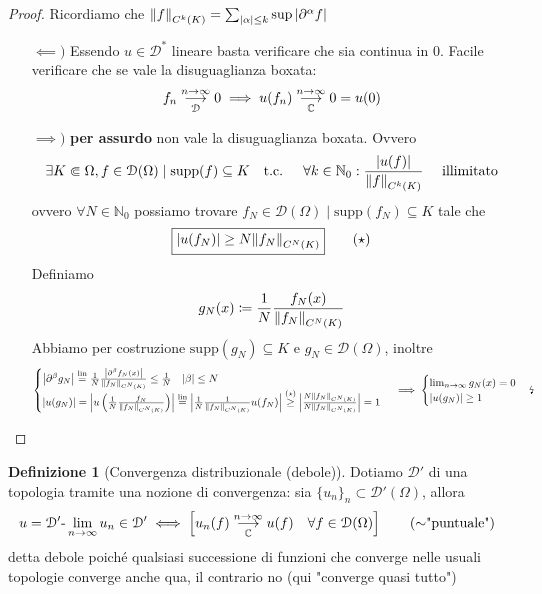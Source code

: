 \documentclass[a4paper,10pt]{article}
\theoremstyle{definition}
\newcommand{\na}{\mathbb{N}} %
\newcommand{\im}{\mathbb{C}} %
\newcommand{\supp}{\text{supp}} %
\newcommand{\llim}[2]{#2\text{-}\lim_{#1\to\infty}} %
\newcommand{\limm}[2]{\overunderset{#1\to\infty}{#2}{\longrightarrow}} %
\theoremstyle{indentdefinition}
\newtheorem{defn}{Definizione}[section]
\theoremstyle{indenttheorem}
\theoremstyle{myremark}
\theoremstyle{indentgeneral}
\begin{document}
    \begin{proof}
            Ricordiamo che $\norm{f}_{C^k(K)}=\sum_{\abs{\alpha}\le k}\sup\abs{\partial^\alpha f}$
            \begin{itemize}
                \item[$\impliedby)$] Essendo $u\in\mathcal{D}^*$ lineare basta verificare che sia continua in 0. Facile verificare che se vale la disuguaglianza boxata:
                $$f_n\limm{n}{\mathcal{D}}0\implies u(f_n)\limm{n}{\im}0=u(0)$$
                \item[$\implies)$] \textbf{per assurdo} non vale la disuguaglianza boxata. Ovvero
                $$\exists K\Subset \Omega,f\in\mathcal{D}(\Omega)\mid\supp(f)\subseteq K\quad \text{t.c. }\quad\forall k\in\na_0:\frac{\abs{u(f)}}{\norm{f}_{C^k(K)}}\quad \text{ illimitato} $$
ovvero $\forall N\in \na_0$ possiamo trovare $f_N\in\mathcal{D}(\Omega)\mid \supp(f_N)\subseteq K$ tale che
$$\boxed{\abs{u(f_N)}\ge N\norm{f_N}_{C^N(K)}}\qquad (\star)$$
Definiamo
$$g_N(x)\coloneqq\frac{1}{N} \frac{f_N(x)}{\norm{f_N}_{C^N(K)}}$$
Abbiamo per costruzione $\supp(g_N)\subseteq K$ e $g_N\in \mathcal{D}(\Omega)$, inoltre 
$$\begin{cases}
    \abs{\partial^\beta g_N}\overset{\text{lin}}{=}\frac{1}{N} \frac{\abs{\partial^\beta f_N(x)}}{\norm{f_N}_{C^N(K)}}\le \frac{1}{N} \quad \abs{\beta}\le N\\
    \abs{u(g_N)}=\abs{u\left(\frac{1}{N} \frac{f_N}{\norm{f_N}_{C^N(K)}}\right)}\overset{\text{lin}}{=}\abs{\frac{1}{N} \frac{1}{\norm{f_N}_{C^N(K)}}u(f_N)}\overset{(\star)}{\ge} \abs{\frac{N\norm{f_N}_{C^N(K)}}{N\norm{f_N}_{C^N(K)}}}=1
\end{cases}\implies \begin{cases}
    \lim_{n\to\infty} g_N(x)=0\\
    \abs{u(g_N)}\ge 1
\end{cases} \text{\lightning}$$    
\end{itemize}
\end{proof}

\begin{defn}[Convergenza distribuzionale (debole)] Dotiamo $\mathcal{D}'$ di una topologia tramite una nozione di convergenza: sia $\{u_n\}_n\subset\mathcal{D}'(\Omega)$, allora
 $$u=\llim{n}{\mathcal{D}'}u_n\in \mathcal{D}'\iff \left[u_n(f)\limm{n}{\im}u(f)\quad\forall f\in \mathcal{D}(\Omega)\right]\qquad  \text{($\sim$"puntuale") }$$
 detta debole poiché qualsiasi successione di funzioni che converge nelle  usuali topologie converge anche qua, il contrario no (qui "converge quasi tutto")
\end{defn}
\end{document}
